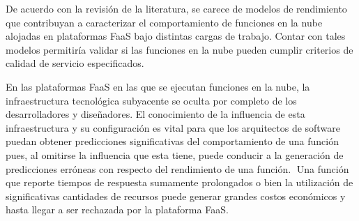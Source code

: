 De acuerdo con la revisión de la literatura, se carece de modelos de rendimiento que contribuyan a caracterizar el comportamiento de funciones en la nube alojadas en plataformas FaaS bajo distintas cargas de trabajo. Contar con tales modelos permitiría validar si las funciones en la nube pueden cumplir criterios de calidad de servicio especificados.

En las plataformas FaaS en las que se ejecutan funciones en la nube, la infraestructura tecnológica subyacente se oculta por completo de los desarrolladores y diseñadores. El conocimiento de la influencia de esta infraestructura y su configuración es vital para que los arquitectos de software puedan obtener predicciones significativas del comportamiento de una función pues, al omitirse la influencia que esta tiene, puede conducir a la generación de predicciones erróneas con respecto del rendimiento de una función. Una función que reporte tiempos de respuesta sumamente prolongados o bien la utilización de significativas cantidades de recursos puede generar grandes costos económicos y hasta llegar a ser rechazada por la plataforma FaaS.